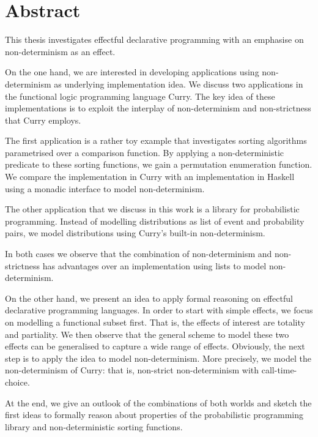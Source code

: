 %
\begingroup
\let\cleardoublepage\clearpage

\chapter*{Abstract}
\label{sec:abstract}
This thesis investigates effectful declarative programming with an
emphasise on non-determinism as an effect.

On the one hand, we are interested in developing applications using
non-determinism as underlying implementation idea.
We discuss two applications in the functional logic programming
language Curry.
The key idea of these implementations is to exploit the interplay of
non-determinism and non-strictness that Curry employs.

The first application is a rather toy example that investigates
sorting algorithms parametrised over a comparison function.
By applying a non-deterministic predicate to these sorting functions,
we gain a permutation enumeration function.
We compare the implementation in Curry with an implementation in
Haskell using a monadic interface to model non-determinism.

The other application that we discuss in this work is a library for
probabilistic programming.
Instead of modelling distributions as list of event and probability
pairs, we model distributions using Curry's built-in non-determinism.

In both cases we observe that the combination of non-determinism and
non-strictness has advantages over an implementation using lists to
model non-determinism.

On the other hand, we present an idea to apply formal reasoning on
effectful declarative programming languages.
In order to start with simple effects, we focus on modelling a
functional subset first.
That is, the effects of interest are totality and partiality.
We then observe that the general scheme to model these two effects can
be generalised to capture a wide range of effects.
Obviously, the next step is to apply the idea to model
non-determinism.
More precisely, we model the non-determinism of Curry: that is,
non-strict non-determinism with call-time-choice.

At the end, we give an outlook of the combinations of both worlds and
sketch the first ideas to formally reason about properties of the
probabilistic programming library and non-deterministic sorting functions.

